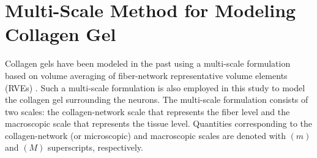 \documentclass[]{interact}
\begin{document}
\section{Multi-Scale Method for Modeling Collagen Gel}
\label{sec:multi-scale_method}
Collagen gels have been modeled in the past using a multi-scale formulation based on volume averaging of fiber-network representative volume elements (RVEs) \citep{Chandran:2007hy,Stylianopoulos:2007dp,Barocas:2007gk,Lai:2012ji,Lake:2012jm}. Such a multi-scale formulation is also employed in this study to model the collagen gel surrounding the neurons. The multi-scale formulation consists of two scales: the collagen-network scale that represents the fiber level and the macroscopic scale that represents the tissue level. Quantities corresponding to the collagen-network (or microscopic) and macroscopic scales are denoted with $(m)$ and $(M)$ superscripts, respectively. 
\end{document}
